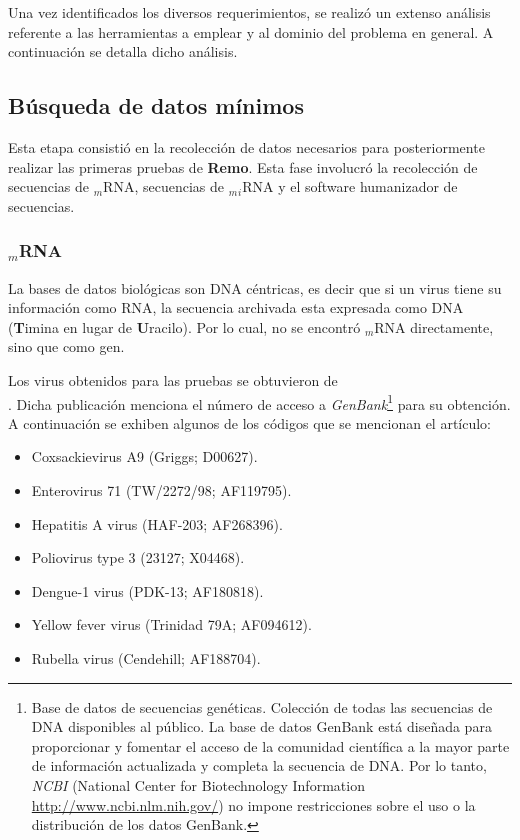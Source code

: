 \par Una vez identificados los diversos requerimientos, se realizó un extenso análisis referente a las herramientas a emplear y al dominio del problema en general. A continuación se detalla dicho análisis.

\subsection{Búsqueda de datos mínimos}
	\par Esta etapa consistió en la recolección de datos necesarios para posteriormente realizar las primeras pruebas de \textbf{Remo}. Esta fase involucró la recolección de secuencias de $_m$RNA, secuencias de $_m$$_i$RNA y el software humanizador de secuencias. 
	
\subsubsection{$_m$RNA}
	\par La bases de datos biológicas son DNA céntricas, es decir que si un virus tiene su información como RNA, la secuencia archivada esta expresada como DNA (\textbf{T}imina en lugar de \textbf{U}racilo). Por lo cual, no se encontró $_m$RNA directamente, sino que como gen.

	\par Los virus obtenidos para las pruebas se obtuvieron de \\
	\cite{holme}. Dicha publicación menciona el número de acceso a \emph{GenBank}\footnote{Base de datos de secuencias genéticas. Colección de todas las secuencias de DNA disponibles al público. La base de datos GenBank está diseñada para proporcionar y fomentar el acceso de la comunidad científica a la mayor parte de información actualizada y completa la secuencia de DNA. Por lo tanto, \textit{NCBI} (National Center for Biotechnology Information \url{http://www.ncbi.nlm.nih.gov/}) no impone restricciones sobre el uso o la distribución de los datos GenBank.} para su obtención. A continuación se exhiben algunos de los códigos que se mencionan el artículo: 
	\begin{itemize}
		\item Coxsackievirus A9 (Griggs; \textsc{D00627}).
		\item Enterovirus 71 (TW/2272/98; \textsc{AF119795}).
		\item Hepatitis A virus (HAF-203; \textsc{AF268396}).
		\item Poliovirus type 3 (23127; \textsc{X04468}).		
		\item Dengue-1 virus (PDK-13; \textsc{AF180818}).
		\item Yellow fever virus (Trinidad 79A; \textsc{AF094612}).
		\item Rubella virus (Cendehill; \textsc{AF188704}).		
	\end{itemize}

